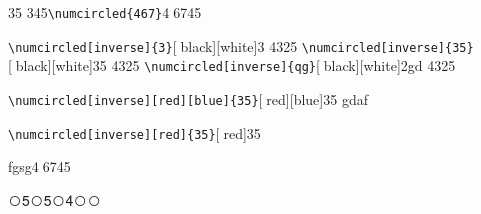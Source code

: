 \documentclass{article}
\begin{document}
\color{red}
35 345\verb|\numcircled{467}|\textcircled{467}45

 \verb|\numcircled[inverse]{3}|\textcircled[black][white]{3} 4325
   \verb|\numcircled[inverse]{35}|\textcircled[black][white]{35} 4325
  \verb|\numcircled[inverse]{qg}|\textcircled[black][white]{2gd} 4325
 
  \verb|\numcircled[inverse][red][blue]{35}|\textcircled[red][blue]{35} gdaf
  
   \verb|\numcircled[inverse][red]{35}|\textcircled[red]{35}

fgsg\textcircled{467}45
   
\newcommand{\wcnt}{\textcircled{\themycnt}}

\wcnt5\wcnt5\wcnt4\wcnt\wcnt
\end{document}
